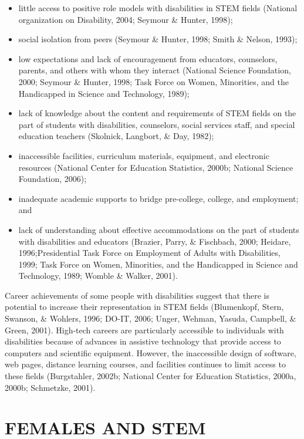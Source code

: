 \documentclass[11.5pt]{sig-alternate} %
\begin{document}
\begin{large}
\begin{itemize}
    \item 	little access to positive role models with disabilities in STEM fields (National organization on Disability, 2004; Seymour \& Hunter, 1998);
    \item 	social isolation from peers (Seymour \& Hun\-ter, 1998; Smith \& Nelson, 1993);
    \item 	low expectations and lack of encouragement from educators, counselors, parents, and others with whom they interact (National Science Foundation, 2000; Seymour \& Hunter, 1998; Task Force on Women, Minorities, and the Handicapped in Science and Technology, 1989);
    \item lack of knowledge about the content and requirements of STEM fields on the part of students with disabilities, counselors, social services staff, and special education teachers (Skolnick, Langbort, \& Day, 1982);
    \item 	inaccessible facilities, curriculum materials, equipment, and electronic resources (National Center for Education Statistics, 2000b; National Science Foundation, 2006);
    \item 	inadequate academic supports to bridge pre-college, college, and employment; and
    \item lack of understanding about effective accommodations on the part of students with disabilities and educators (Brazier, Parry, \& Fischbach, 2000; Heidare, 1996;Presidential Task Force on Employment of Adults with Disabilities, 1999; Task Force on Women, Minorities, and the Handicapped in Science and Technology, 1989; Womble \& Walker, 2001).
\end{itemize}
 
Career achievements of some people with disabilities suggest that there is potential to increase their representation in STEM fields (Blumenkopf, Stern, Swanson, \& Wohlers, 1996; DO-IT, 2006; Unger, Wehman, Yasuda, Campbell, \& Green, 2001). High-tech careers are particularly accessible to individuals with disabilities because of advances in assistive technology that provide access to computers and scientific equipment. However, the inaccessible design of software, web pages, distance learning courses, and facilities continues to limit access to these fields (Burgstahler, 2002b; National Center for Education Statistics, 2000a, 2000b; Schmetzke, 2001). 
 
\section*{FEMALES AND STEM}
 

\end{large}
\end{document}
